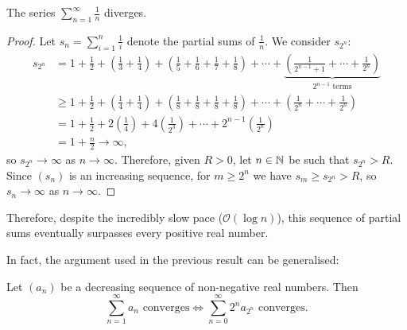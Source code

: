 \documentclass[../analysis1.tex]{subfiles}
\begin{document}
\begin{theorem}
    \begin{shaded*}
        The series $\sum_{n=1}^{\infty}\frac{1}{n}$ diverges.
    \end{shaded*}
\end{theorem}
\begin{proof}
    Let $s_n=\sum_{i=1}^n\frac{1}{i}$ denote the partial sums of $\frac{1}{n}$. We consider $s_{2^n}$:
    \begin{align*}
        s_{2^n}&=1+\frac{1}{2}+\left(\frac{1}{3}+\frac{1}{4}\right)+\left(\frac{1}{5}+\frac{1}{6}+\frac{1}{7}+\frac{1}{8}\right)+\cdots+\underbrace{\left(\frac{1}{2^{n-1}+1}+\cdots+\frac{1}{2^n}\right)}_{2^{n-1}\text{ terms}}\\
        & \ge 1+\frac{1}{2}+\left(\frac{1}{4}+\frac{1}{4}\right)+\left(\frac{1}{8}+\frac{1}{8}+\frac{1}{8}+\frac{1}{8}\right)+\cdots+\left(\frac{1}{2^{n}}+\cdots+\frac{1}{2^n}\right)\\
        &= 1 + \frac{1}{2}+2\left(\frac{1}{4}\right)+4\left(\frac{1}{2^3}\right)+\cdots+2^{n-1}\left(\frac{1}{2^n}\right)\\
        &=1+\frac{n}{2}\to\infty,
    \end{align*}
    so $s_{2^n}\to\infty$ as $n\to\infty$. Therefore, given $R>0$, let $n\in\mathbb{N}$ be such that $s_{2^n}>R$. Since $(s_n)$ is an increasing sequence, for $m\ge 2^n$ we have $s_m\ge s_{2^n}>R$, so $s_n\to\infty$ as $n\to\infty$.\qedhere 
\end{proof}

Therefore, despite the incredibly slow pace ($\mathcal{O}(\log n)$), this sequence of partial sums eventually surpasses every positive real number.\par

In fact, the argument used in the previous result can be generalised:


\begin{theorem}
\label{thm:cauchycondensation}
    \begin{shaded*}
        Let $(a_n)$ be a decreasing sequence of non-negative real numbers. Then $$\sum_{n=1}^{\infty}a_n\text{ converges}\iff \sum_{n=0}^{\infty}2^na_{2^n}\text{ converges}.$$
    \end{shaded*}
\end{theorem}
\end{document}
